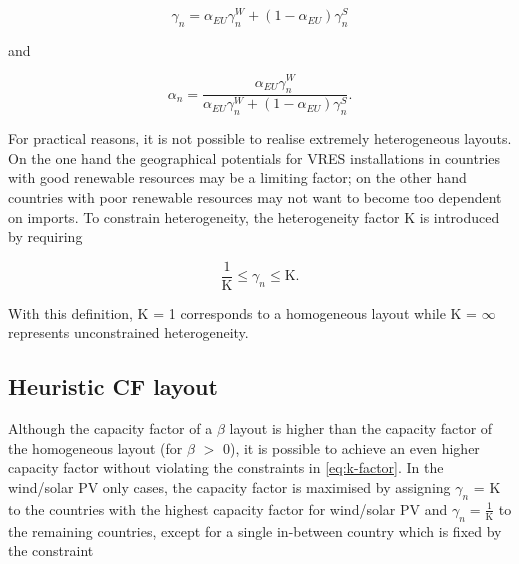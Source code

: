\documentclass[a4paper, 5p, sort&compress]{elsarticle}%
\begin{document}

\begin{equation}
  \label{eq:9}
  \gamma_{n} = \alpha_{EU} \gamma^{W}_{n} + (1-\alpha_{EU}) \gamma^{S}_{n}
\end{equation}

and

\begin{equation}
  \label{eq:9}
  \alpha_{n} = \frac{\alpha_{EU} \gamma_{n}^{W}}{\alpha_{EU} \gamma_{n}^{W} + (1-\alpha_{EU}) \gamma_{n}^{S}} .
\end{equation}


For practical reasons, it is not possible to realise extremely
heterogeneous layouts. On the one hand the geographical potentials for
VRES installations in countries with good renewable resources may be a limiting factor; on the
other hand countries with poor renewable resources may not want to become too dependent on imports.
To constrain heterogeneity, the heterogeneity
factor K is introduced by requiring

\begin{equation}
  \label{eq:k-factor}
  \frac{1}{\text{K}} \leq \gamma_{n} \leq \text{K} .
\end{equation}

With this definition, K = 1 corresponds to a homogeneous layout while
K = $\infty$ represents unconstrained heterogeneity.


\subsection{Heuristic CF layout}
\label{sec:CF-layout}


Although the capacity factor of a $\beta$ layout is higher than the
capacity factor of the homogeneous layout (for $\beta$ $>$ 0), it is
possible to achieve an even higher capacity factor without violating
the constraints in \cref{eq:k-factor}. In the wind/solar PV only
cases, the capacity factor is maximised by assigning $\gamma_{n}$ = K to
the countries with the highest capacity factor for wind/solar PV and
$\gamma_{n} = \frac{1}{\text{K}}$ to the remaining countries, except for a
single in-between country which is fixed by the constraint
\end{document}
